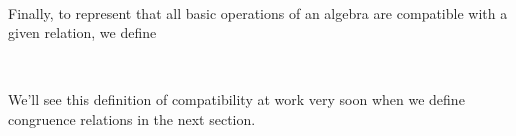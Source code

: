 \documentclass[a4paper,UKenglish,cleveref,autoref,thm-restate]{lipics-v2021}
\begin{document}
\begin{code}
\>[1]\AgdaSpace{}%
\AgdaSymbol{:}\AgdaSpace{}%
\AgdaSymbol{\{}\AgdaSpace{}%
\AgdaSymbol{:}\AgdaSpace{}%
\AgdaSpace{}%
\AgdaSpace{}%
\AgdaSymbol{\}}\AgdaSpace{}%
\AgdaSpace{}%
\AgdaSpace{}%
\AgdaSpace{}%
\AgdaSpace{}%
\AgdaSpace{}%
\AgdaSpace{}%
\AgdaSpace{}%
\AgdaSpace{}%
\AgdaSpace{}%
\AgdaSpace{}%
\AgdaSpace{}%
\AgdaSpace{}%
\AgdaSpace{}%
\AgdaSpace{}%
\AgdaSpace{}%
\AgdaSpace{}%
\<%
\\
%
\>[1]\AgdaSpace{}%
\AgdaSymbol{\{}\AgdaSymbol{\}}\AgdaSpace{}%
\AgdaSpace{}%
\AgdaSpace{}%
\AgdaSymbol{=}\AgdaSpace{}%
\AgdaSymbol{\}\{}\AgdaSymbol{\}}\AgdaSpace{}%
\AgdaSpace{}%
\AgdaSymbol{(}\AgdaSpace{}%
\AgdaSymbol{)}\AgdaSpace{}%
\AgdaSpace{}%
%
\>[53]\AgdaSpace{}%
\AgdaSpace{}%
\AgdaSymbol{((}\AgdaSpace{}%
\AgdaSpace{}%
\AgdaSymbol{)}\AgdaSpace{}%
\AgdaSymbol{)}\AgdaSpace{}%
\AgdaSymbol{((}\AgdaSpace{}%
\AgdaSpace{}%
\AgdaSymbol{)}\AgdaSpace{}%
\AgdaSymbol{)}\<%
\end{code}
\ccpad
Finally, to represent that all basic operations of an algebra are compatible with a given relation, we define
\ccpad
\begin{code}
\>[1]\AgdaSpace{}%
\AgdaSymbol{:}{\AgdaSpace{}}%
\AgdaSymbol{(}\AgdaSpace{}%
\AgdaSymbol{:}\AgdaSpace{}%
\AgdaSpace{}%
\AgdaSpace{}%
\AgdaSymbol{)}\AgdaSpace{}%
\AgdaSpace{}%
\AgdaSpace{}%
\AgdaSpace{}%
\AgdaSpace{}%
\AgdaSpace{}%
\AgdaSpace{}%
\AgdaSpace{}%
\AgdaSpace{}%
\AgdaSpace{}%
\AgdaSpace{}%
\AgdaSpace{}%
\AgdaSpace{}%
\AgdaSpace{}%
\AgdaSpace{}%
\<%
\\
%
\>[1]%
\>[13]\AgdaSpace{}%
\AgdaSpace{}%
\AgdaSymbol{=}\AgdaSpace{}%
\AgdaSpace{}%
\AgdaSpace{}%
\AgdaSpace{}%
\AgdaSymbol{\{}\AgdaSymbol{\}}\AgdaSpace{}%
\AgdaSpace{}%
\<%
\end{code}
\ccpad
We'll see this definition of compatibility at work very soon when we define congruence relations in the next section.
\end{document}
